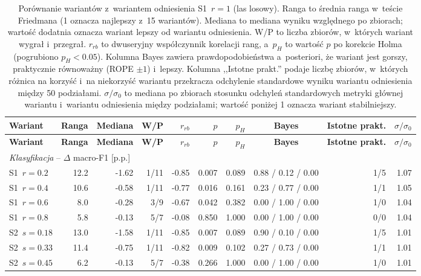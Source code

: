 {\scriptsize\setlength{\tabcolsep}{4pt}
\begin{longtable}{lrrrrrrcrr}
\caption{Porównanie wariantów z~wariantem odniesienia S1~$r=1$ (las losowy). Ranga to średnia ranga w~teście Friedmana (1 oznacza najlepszy z~15 wariantów). Mediana to mediana wyniku względnego po zbiorach; wartość dodatnia oznacza wariant lepszy od wariantu odniesienia. W/P to liczba zbiorów, w~których wariant wygrał i~przegrał. $r_{rb}$ to dwuseryjny współczynnik korelacji rang, a~$p_H$ to wartość $p$ po korekcie Holma (pogrubiono $p_H<0.05$). Kolumna Bayes zawiera prawdopodobieństwa a~posteriori, że wariant jest gorszy, praktycznie równoważny (ROPE $\pm1$) i~lepszy. Kolumna ,,Istotne prakt.'' podaje liczbę zbiorów, w~których różnica na korzyść i~na niekorzyść wariantu przekracza odchylenie standardowe wyniku wariantu odniesienia między 50 podziałami. $\sigma/\sigma_0$ to mediana po zbiorach stosunku odchyleń standardowych metryki głównej wariantu i~wariantu odniesienia między podziałami; wartość poniżej 1 oznacza wariant stabilniejszy.}
\label{tab:kontrola}\\
\toprule
\textbf{Wariant} & \textbf{Ranga} & \textbf{Mediana} & \textbf{W/P} & $r_{rb}$ & $p$ & $p_H$ & \textbf{Bayes} & \textbf{Istotne prakt.} & $\sigma/\sigma_0$ \\
\endfirsthead
\toprule
\textbf{Wariant} & \textbf{Ranga} & \textbf{Mediana} & \textbf{W/P} & $r_{rb}$ & $p$ & $p_H$ & \textbf{Bayes} & \textbf{Istotne prakt.} & $\sigma/\sigma_0$ \\
\endhead
\midrule
\multicolumn{10}{l}{\emph{Klasyfikacja} -- $\Delta$ macro-F1 [p.p.]}\\
S1~$r=0.2$ & 12.2 & -1.62 & 1/11 & -0.85 & 0.007 & 0.089 & 0.88 / 0.12 / 0.00 & 1/5 & 1.07 \\
S1~$r=0.4$ & 10.6 & -0.58 & 1/11 & -0.77 & 0.016 & 0.161 & 0.23 / 0.77 / 0.00 & 1/1 & 1.05 \\
S1~$r=0.6$ & 8.0 & -0.28 & 3/9 & -0.67 & 0.042 & 0.382 & 0.00 / 1.00 / 0.00 & 1/0 & 1.04 \\
S1~$r=0.8$ & 5.8 & -0.13 & 5/7 & -0.08 & 0.850 & 1.000 & 0.00 / 1.00 / 0.00 & 0/0 & 1.04 \\
S2~$s=0.18$ & 13.0 & -1.58 & 1/11 & -0.85 & 0.007 & 0.089 & 0.90 / 0.10 / 0.00 & 1/5 & 1.01 \\
S2~$s=0.33$ & 11.4 & -0.75 & 1/11 & -0.82 & 0.009 & 0.102 & 0.27 / 0.73 / 0.00 & 1/1 & 1.01 \\
S2~$s=0.45$ & 6.2 & -0.13 & 5/7 & -0.38 & 0.266 & 1.000 & 0.00 / 1.00 / 0.00 & 1/0 & 1.01 \\

\end{longtable}}
